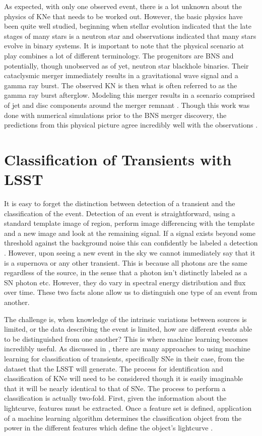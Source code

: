\documentclass[12pt]{article}
\begin{document}
As expected, with only one observed event, there is a lot unknown about the physics of KNe that needs to be worked out. However, the basic physics have been quite well studied, beginning when stellar evolution indicated that the late stages of many stars is a neutron star and observations indicated that many stars evolve in binary systems. It is important to note that the physical scenario at play combines a lot of different terminology. The progenitors are BNS and potentially, though unobserved as of yet, neutron star blackhole binaries. Their cataclysmic merger immediately results in a gravitational wave signal and a gamma ray burst. The observed KN is then what is often referred to as the gamma ray burst afterglow. Modeling this merger results in a scenario comprised of jet and disc components around the merger remnant \citep{Rosswog2016a}. Though this work was done with numerical simulations prior to the BNS merger discovery, the predictions from this physical picture agree incredibly well with the observations \citep{Kasliwal2017}.\par

\section{Classification of Transients with LSST} %
It is easy to forget the distinction between detection of a transient and the classification of the event. Detection of an event is straightforward, using a standard template image of region, perform image differencing with the template and a new image and look at the remaining signal. If a signal exists beyond some threshold against the background noise this can confidently be labeled a detection \citep{LSSTScienceCollaboration2009}. However, upon seeing a new event in the sky we cannot immediately say that it is a supernova or any other transient. This is because all photons are the same regardless of the source, in the sense that a photon isn't distinctly labeled as a SN photon etc. However, they do vary in spectral energy distribution and flux over time. These two facts alone allow us to distinguish one type of an event from another. \par
The challenge is, when knowledge of the intrinsic variations between sources is limited, or the data describing the event is limited, how are different events able to be distinguished from one another? This is where machine learning becomes incredibly useful. As discussed in \cite{Lochner2016}, there are many approaches to using machine learning for classification of transients, specifically SNe in their case, from the dataset that the LSST will generate. The process for identification and classification of KNe will need to be considered though it is easily imaginable that it will be nearly identical to that of SNe. The process to perform a classification is actually two-fold. First, given the information about the lightcurve, features must be extracted. Once a feature set is defined, application of a machine learning algorithm determines the classification object from the power in the different features which define the object's lightcurve \citep{Lochner2016}. \par
\end{document}
